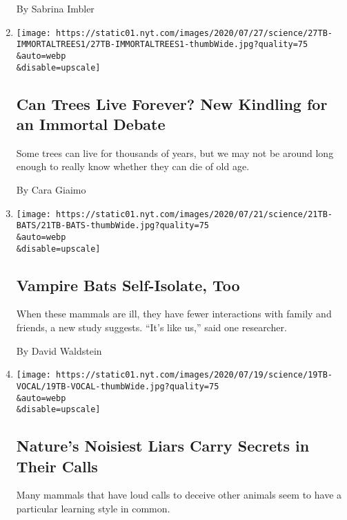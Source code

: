 \begin{enumerate}
  By Sabrina Imbler
\item
  \href{/2020/07/27/science/trees-immortality.html}{}

  \texttt{[image: https://static01.nyt.com/images/2020/07/27/science/27TB-IMMORTALTREES1/27TB-IMMORTALTREES1-thumbWide.jpg?quality=75\\\&auto=webp\\\&disable=upscale]}

  \hypertarget{can-trees-live-forever-new-kindling-for-an-immortal-debate}{%
  \subsection{Can Trees Live Forever? New Kindling for an Immortal
  Debate}\label{can-trees-live-forever-new-kindling-for-an-immortal-debate}}

  Some trees can live for thousands of years, but we may not be around
  long enough to really know whether they can die of old age.

  By Cara Giaimo
\item
  \href{/2020/07/22/science/vampire-bats-viruses.html}{}

  \texttt{[image: https://static01.nyt.com/images/2020/07/21/science/21TB-BATS/21TB-BATS-thumbWide.jpg?quality=75\\\&auto=webp\\\&disable=upscale]}

  \hypertarget{vampire-bats-self-isolate-too}{%
  \subsection{Vampire Bats Self-Isolate,
  Too}\label{vampire-bats-self-isolate-too}}

  When these mammals are ill, they have fewer interactions with family
  and friends, a new study suggests. ``It's like us,'' said one
  researcher.

  By David Waldstein
\item
  \href{/2020/07/21/science/mammals-vocal-learning.html}{}

  \texttt{[image: https://static01.nyt.com/images/2020/07/19/science/19TB-VOCAL/19TB-VOCAL-thumbWide.jpg?quality=75\\\&auto=webp\\\&disable=upscale]}

  \hypertarget{natures-noisiest-liars-carry-secrets-in-their-calls}{%
  \subsection{Nature's Noisiest Liars Carry Secrets in Their
  Calls}\label{natures-noisiest-liars-carry-secrets-in-their-calls}}

  Many mammals that have loud calls to deceive other animals seem to
  have a particular learning style in common.


\end{enumerate}
